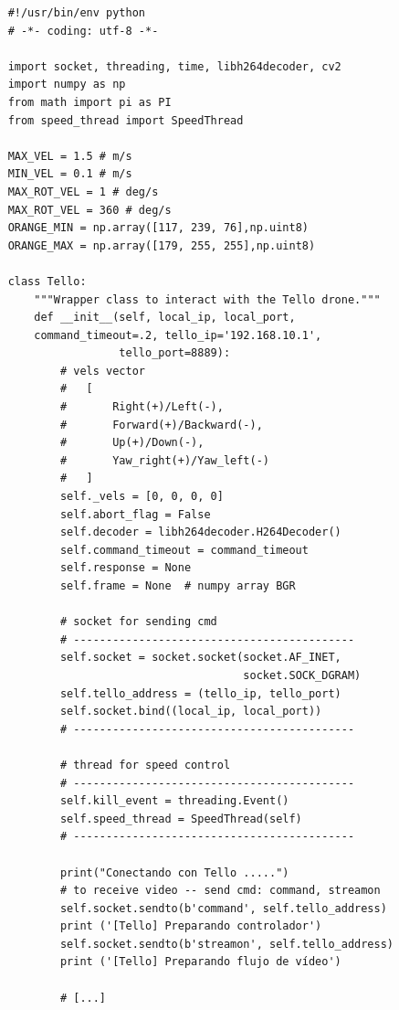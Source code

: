 \begin{verbatim}
    #!/usr/bin/env python
    # -*- coding: utf-8 -*-
    
    import socket, threading, time, libh264decoder, cv2
    import numpy as np
    from math import pi as PI
    from speed_thread import SpeedThread
    
    MAX_VEL = 1.5 # m/s
    MIN_VEL = 0.1 # m/s
    MAX_ROT_VEL = 1 # deg/s
    MAX_ROT_VEL = 360 # deg/s
    ORANGE_MIN = np.array([117, 239, 76],np.uint8)
    ORANGE_MAX = np.array([179, 255, 255],np.uint8)
    
    class Tello:
        """Wrapper class to interact with the Tello drone."""
        def __init__(self, local_ip, local_port,
        command_timeout=.2, tello_ip='192.168.10.1',
                     tello_port=8889):
            # vels vector
            #   [
            #       Right(+)/Left(-),
            #       Forward(+)/Backward(-),
            #       Up(+)/Down(-),
            #       Yaw_right(+)/Yaw_left(-)
            #   ]
            self._vels = [0, 0, 0, 0]
            self.abort_flag = False
            self.decoder = libh264decoder.H264Decoder()
            self.command_timeout = command_timeout
            self.response = None  
            self.frame = None  # numpy array BGR
    
            # socket for sending cmd
            # -------------------------------------------
            self.socket = socket.socket(socket.AF_INET,
                                        socket.SOCK_DGRAM)  
            self.tello_address = (tello_ip, tello_port)
            self.socket.bind((local_ip, local_port))
            # -------------------------------------------
    
            # thread for speed control
            # -------------------------------------------
            self.kill_event = threading.Event()
            self.speed_thread = SpeedThread(self)
            # -------------------------------------------
    
            print("Conectando con Tello .....")
            # to receive video -- send cmd: command, streamon
            self.socket.sendto(b'command', self.tello_address)
            print ('[Tello] Preparando controlador')
            self.socket.sendto(b'streamon', self.tello_address)
            print ('[Tello] Preparando flujo de vídeo')
    
            # [...]
\end{verbatim}
\begin{lstlisting}[caption=Snippet del Driver de Tello]
\end{lstlisting}

